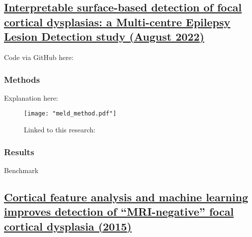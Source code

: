 \subsection{\href{https://academic.oup.com/brain/article/145/11/3859/6659752?login=true}{Interpretable surface-based detection of focal cortical dysplasias: a Multi-centre Epilepsy Lesion Detection study (August 2022)}}
\label{sub:sec:meld_research}

Code via GitHub here: 

\subsubsection{Methods}

Explanation here: 

\begin{figure}[htbp]
	\centering
	\texttt{[image: "meld\_method.pdf"]}
	\caption{Linked to this research: }%
	\label{fig:meld_explanation}
\end{figure}

\subsubsection{Results}

\begin{table}[htbp]
	\centering
	\caption{Benchmark}

	\caption{Results}
\end{table}

\subsection{\href{https://www.sciencedirect.com/science/article/pii/S1525505015002322}{Cortical feature analysis and machine learning improves detection of “MRI-negative” focal cortical dysplasia (2015)}}

